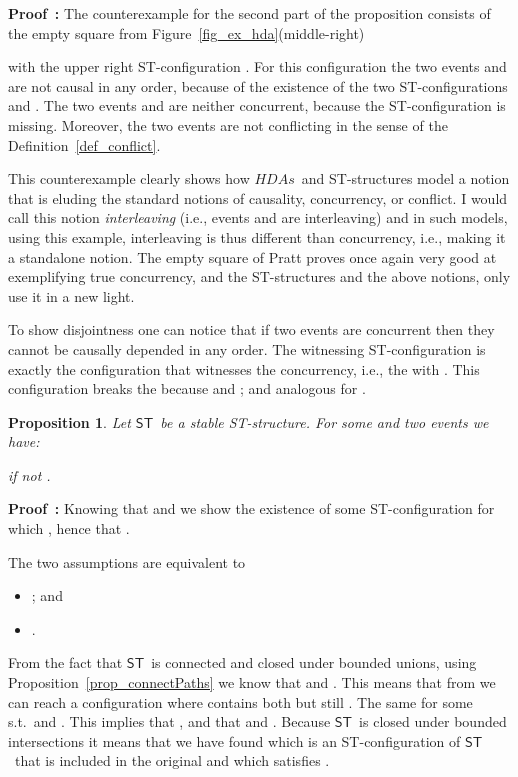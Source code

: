 \documentclass[submission,copyright,creativecommons]{eptcs}
\newtheorem{proposition}[theorem]{Proposition}
\newenvironment{proof}[1][\!\!\,]{\vspace{1ex}\noindent\textbf{Proof #1: }}{\hfill\vspace{2ex}}
\newcommand\HDAs{\ensuremath{\mathit{HDAs}}}
\newcommand\ST{\ensuremath{\mathsf{ST}}}
\begin{document}
\begin{proof}
The counterexample for the second part of the proposition consists of the empty square from Figure~\ref{fig_ex_hda}(middle-right) 

with the upper right ST-configuration . For this configuration the two events  and  are not causal in any order, because of the existence of the two ST-configurations  and . The two events  and  are neither concurrent, because the ST-configuration  is missing. Moreover, the two events are not conflicting in the sense of the Definition~\ref{def_conflict}.

This counterexample clearly shows how \HDAs\ and ST-structures model a notion that is eluding the standard notions of causality, concurrency, or conflict. I would call this notion \textit{interleaving} (i.e., events  and  are interleaving) and in such models, using this example, interleaving is thus different than concurrency, i.e., making it a standalone notion. The empty square of Pratt proves once again very good at exemplifying true concurrency, and the ST-structures and the above notions, only use it in a new light.

To show disjointness one can notice that if two events are concurrent then they cannot be causally depended in any order. The witnessing ST-configuration is exactly the configuration that witnesses the concurrency, i.e., the  with . This configuration breaks the  because  and ; and analogous for .
\end{proof}



\begin{proposition}\label{prop_concCausalStable}
Let \ST\ be a \emph{stable} ST-structure. For some  and two events  we have: 

\centerline{ if not .}
\end{proposition}


\begin{proof}
Knowing that  and  we show the existence of some ST-configuration  for which , hence that .

The two assumptions are equivalent to 
\begin{itemize}
\item ; and
\item .
\end{itemize}
From the fact that \ST\ is connected and closed under bounded unions, using Proposition~\ref{prop_connectPaths} we know that  and . This means that from  we can reach a configuration  where  contains both  but still . The same for some  s.t.\  and . This implies that , and that  and . Because \ST\ is closed under bounded intersections it means that we have found  which is an ST-configuration of \ST\ that is included in the original  and which satisfies .
\end{proof}
\end{document}
